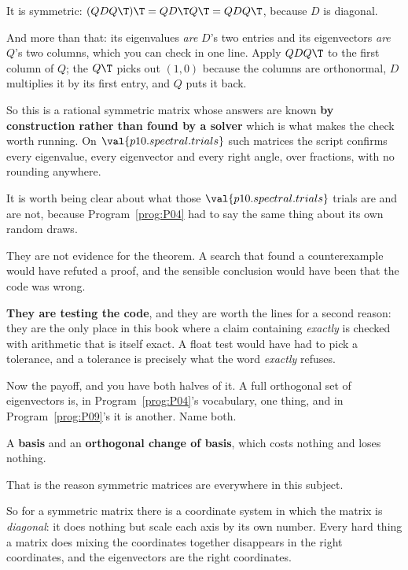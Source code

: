 \begin{fr}
\begin{ansblock}
It is symmetric: $(QDQ\T)\T = Q D\T Q\T = Q D Q\T$, because $D$ is diagonal.
\end{ansblock}

And more than that: its eigenvalues \emph{are} $D$'s two entries and its
eigenvectors \emph{are} $Q$'s two columns, which you can check in one line.
Apply $QDQ\T$ to the first column of $Q$; the $Q\T$ picks out $(1,0)$ because
the columns are orthonormal, $D$ multiplies it by its first entry, and $Q$ puts
it back.

So this is a rational symmetric matrix whose answers are known \textbf{by
construction rather than found by a solver} \dash{} which is what makes the
check worth running. On $\val{p10.spectral.trials}$ such matrices the script
confirms every eigenvalue, every eigenvector and every right angle, over
fractions, with no rounding anywhere.
\end{fr}

\begin{fr}
It is worth being clear about what those $\val{p10.spectral.trials}$ trials are
and are not, because Program~\ref{prog:P04} had to say the same thing about its
own random draws.

They are not evidence for the theorem. A search that found a counterexample
would have refuted a proof, and the sensible conclusion would have been that
the code was wrong.

\textbf{They are testing the code}, and they are worth the lines for a second
reason: they are the only place in this book where a claim containing
\emph{exactly} is checked with arithmetic that is itself exact. A float test
would have had to pick a tolerance, and a tolerance is precisely what the word
\emph{exactly} refuses.

Now the payoff, and you have both halves of it. A full orthogonal set of
eigenvectors is, in Program~\ref{prog:P04}'s vocabulary, one thing, and in
Program~\ref{prog:P09}'s it is another. Name both.
\dotline
\nextframe
\end{fr}

\begin{fr}
\begin{ansblock}
A \textbf{basis} \dash{} and an \textbf{orthogonal change of basis}, which
costs nothing and loses nothing.
\end{ansblock}

That is the reason symmetric matrices are everywhere in this subject.

So for a symmetric matrix there is a coordinate system in which the matrix is
\emph{diagonal}: it does nothing but scale each axis by its own number. Every
hard thing a matrix does \dash{} mixing the coordinates together \dash{}
disappears in the right coordinates, and the eigenvectors are the right
coordinates.
\end{fr}

